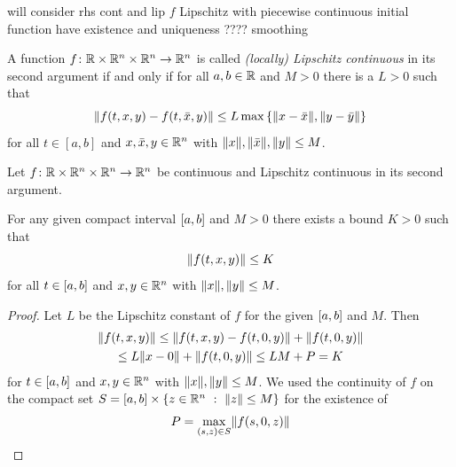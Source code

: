     will consider rhs cont and lip
    $f$ Lipschitz with piecewise continuous initial function have existence and uniqueness ???? smoothing

    \begin{definition}\label{def:lipschitz}
        A function $f\colon\mathbb{R}\times\mathbb{R}^n\times\mathbb{R}^n\to\mathbb{R}^n$ is called \emph{(locally) Lipschitz continuous} in its second argument if and only if for all $a,b\in\mathbb{R}$ and $M>0$ there is a $L>0$ such that
        \begin{equation*}
            \nnorm*{f(t,x,y) - f(t,\bar{x},y)} \leq L\max\left\{\nnorm*{x - \bar{x}},\nnorm*{y - \bar{y}}\right\}
        \end{equation*}
        for all $t\in [a,b]$ and $x,\bar{x},y\in\mathbb{R}^n$ with $\lVert x\rVert,\lVert\bar{x}\rVert,\lVert y\rVert\leq M$.
    \end{definition}

    \begin{lemma}\label{lm:bounded-lipschitz}
        Let $f\colon\mathbb{R}\times\mathbb{R}^n\times\mathbb{R}^n\to\mathbb{R}^n$ be continuous and Lipschitz continuous in its second argument.

        For any given compact interval $[a,b]$ and $M>0$ there exists a bound $K>0$ such that
        \begin{equation}
            \lVert f(t,x,y)\rVert\leq K
        \end{equation}
        for all $t\in[a,b]$ and $x,y\in\mathbb{R}^n$ with $\lVert x\rVert,\lVert y\rVert\leq M$.
    \end{lemma}
    \begin{proof}
        Let $L$ be the Lipschitz constant of $f$ for the given $[a,b]$ and $M$. Then
        \begin{multline*}
            \lVert f(t,x,y)\rVert \leq \lVert f(t,x,y) - f(t,0,y)\rVert + \lVert f(t,0,y)\rVert\\
            \leq L\lVert x-0\rVert + \lVert f(t,0,y)\rVert \leq LM+P = K
        \end{multline*}
        for $t\in[a,b]$ and $x,y\in\mathbb{R}^n$ with $\lVert x\rVert,\lVert y\rVert\leq M$. We used the continuity of $f$ on the compact set $S=[a,b]\times\left\{z\in\mathbb{R}^n~\mathrel{\mathop{:}}~\lVert z\rVert\leq M\right\}$ for the existence of
        \begin{equation*}
            P = \max_{(s,z)\in S}\lVert f(s,0,z)\rVert
        \end{equation*}
    \end{proof}

